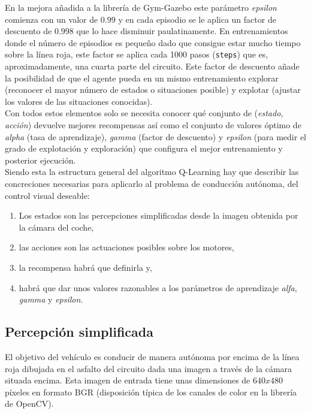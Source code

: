 En la mejora añadida a la librería de Gym-Gazebo este parámetro \textit{epsilon} comienza con un valor de $0.99$ y en cada episodio se le aplica un factor de descuento de 0.998 que lo hace disminuir paulatinamente. En entrenamientos donde el número de episodios es pequeño dado que consigue estar mucho tiempo sobre la línea roja, este factor se aplica cada 1000 pasos (\texttt{steps}) que es, aproximadamente, una cuarta parte del circuito. Este factor de descuento añade la posibilidad de que el agente pueda en un mismo entrenamiento explorar (reconocer el mayor número de estados o situaciones posible) y explotar (ajustar los valores de las situaciones conocidas).\\

Con todos estos elementos solo se necesita conocer qué conjunto de (\textit{estado, acción}) devuelve mejores recompensas así como el conjunto de valores óptimo de \textit{alpha} (tasa de aprendizaje), \textit{gamma} (factor de descuento) y \textit{epsilon} (para medir el grado de explotación y exploración) que configura el mejor entrenamiento y posterior ejecución.\\

Siendo esta la estructura general del algoritmo Q-Learning hay que describir las concreciones necesarias para aplicarlo al problema de conducción autónoma, del control visual deseable: 
\begin{enumerate}
    \item Los estados son las percepciones simplificadas desde la imagen obtenida por la cámara del coche,
    \item las acciones son las actuaciones posibles sobre los motores,
    \item la recompensa habrá que definirla y,
    \item habrá que dar unos valores razonables a los parámetros de aprendizaje \textit{alfa}, \textit{gamma} y \textit{epsilon}.
\end{enumerate}


\subsection{Percepción simplificada}\label{percepcion-simplificada}

El objetivo del vehículo es conducir de manera autónoma por encima de la línea roja dibujada en el asfalto del circuito dada una imagen a través de la cámara situada encima. Esta imagen de entrada tiene unas dimensiones de $640x480$ píxeles en formato BGR (disposición típica de los canales de color en la librería de OpenCV).\\

